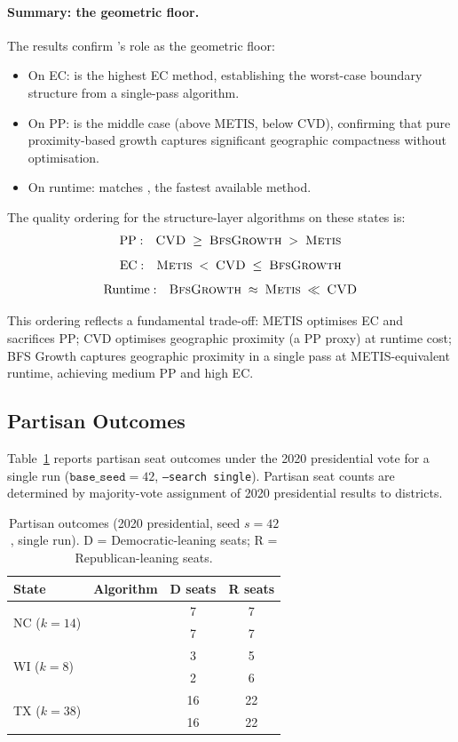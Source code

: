 \paragraph{Summary: the geometric floor.}
The results confirm \bfsg{}'s role as the geometric floor:
\begin{itemize}
\item On EC: \bfsg{} is the highest EC method, establishing the
  worst-case boundary structure from a single-pass algorithm.
\item On PP: \bfsg{} is the middle case (above METIS, below CVD),
  confirming that pure proximity-based growth captures significant
  geographic compactness without optimisation.
\item On runtime: \bfsg{} matches \metis{}, the fastest available method.
\end{itemize}

The quality ordering for the structure-layer algorithms on these states is:
\[
  \mathrm{PP:}\quad \textsc{CVD}{} \;\geq\; \textsc{BfsGrowth}{} \;>\; \textsc{Metis}{}
\]
\[
  \mathrm{EC:}\quad \textsc{Metis}{} \;<\; \textsc{CVD}{} \;\leq\; \textsc{BfsGrowth}{}
\]
\[
  \mathrm{Runtime:}\quad \textsc{BfsGrowth}{} \;\approx\; \textsc{Metis}{} \;\ll\; \textsc{CVD}{}
\]

This ordering reflects a fundamental trade-off: METIS optimises EC and
sacrifices PP; CVD optimises geographic proximity (a PP proxy) at
runtime cost; BFS Growth captures geographic proximity in a single pass
at METIS-equivalent runtime, achieving medium PP and high EC.

\subsection{Partisan Outcomes}

Table~\ref{tab:partisan} reports partisan seat outcomes under the 2020
presidential vote for a single run ($\mathtt{base\_seed} = 42$,
\texttt{--search single}).
Partisan seat counts are determined by majority-vote assignment of 2020
presidential results to districts.

\begin{table}[t]
\centering
\caption{Partisan outcomes (2020 presidential, seed $s=42$, single run).
  D = Democratic-leaning seats; R = Republican-leaning seats.}
\label{tab:partisan}
\begin{tabular}{llcc}
\toprule
State & Algorithm & D seats & R seats \\
\midrule
\multirow{2}{*}{NC ($k=14$)}
  & \bfsg{}  & 7 & 7 \\
  & \metis{} & 7 & 7 \\
\midrule
\multirow{2}{*}{WI ($k=8$)}
  & \bfsg{}  & 3 & 5 \\
  & \metis{} & 2 & 6 \\
\midrule
\multirow{2}{*}{TX ($k=38$)}
  & \bfsg{}  & 16 & 22 \\
  & \metis{} & 16 & 22 \\
\bottomrule
\end{tabular}
\end{table}

